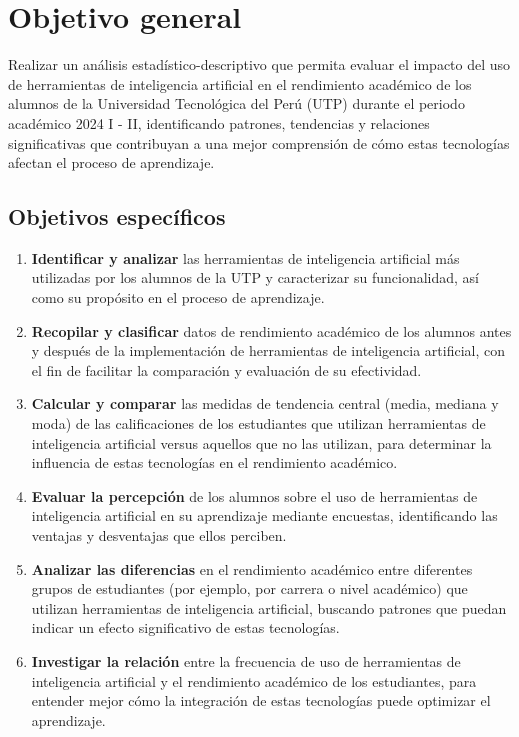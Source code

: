 \documentclass{article}
\newenvironment{objetivoGeneral}{}{}
\begin{document}
\newpage

\begin{objetivoGeneral}
  \section{Objetivo general}

  Realizar un análisis estadístico-descriptivo que permita evaluar el impacto del uso de herramientas de inteligencia artificial en el rendimiento académico de los alumnos de la Universidad Tecnológica del Perú (UTP) durante el periodo académico 2024 I - II, identificando patrones, tendencias y relaciones significativas que contribuyan a una mejor comprensión de cómo estas tecnologías afectan el proceso de aprendizaje.
  
  
  \subsection{Objetivos específicos}
  
  \begin{enumerate}
    \item \textbf{Identificar y analizar} las herramientas de inteligencia artificial más utilizadas por los alumnos de la UTP y caracterizar su funcionalidad, así como su propósito en el proceso de aprendizaje.
  
    \item \textbf{Recopilar y clasificar} datos de rendimiento académico de los alumnos antes y después de la implementación de herramientas de inteligencia artificial, con el fin de facilitar la comparación y evaluación de su efectividad.
  
    \item \textbf{Calcular y comparar} las medidas de tendencia central (media, mediana y moda) de las calificaciones de los estudiantes que utilizan herramientas de inteligencia artificial versus aquellos que no las utilizan, para determinar la influencia de estas tecnologías en el rendimiento académico.
  
    \item \textbf{Evaluar la percepción} de los alumnos sobre el uso de herramientas de inteligencia artificial en su aprendizaje mediante encuestas, identificando las ventajas y desventajas que ellos perciben.
  
    \item \textbf{Analizar las diferencias} en el rendimiento académico entre diferentes grupos de estudiantes (por ejemplo, por carrera o nivel académico) que utilizan herramientas de inteligencia artificial, buscando patrones que puedan indicar un efecto significativo de estas tecnologías.
  
    \item \textbf{Investigar la relación} entre la frecuencia de uso de herramientas de inteligencia artificial y el rendimiento académico de los estudiantes, para entender mejor cómo la integración de estas tecnologías puede optimizar el aprendizaje.
  \end{enumerate}
\end{objetivoGeneral}
\end{document}
